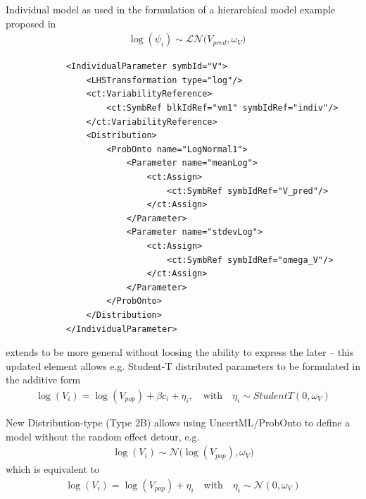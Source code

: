 \begin{example}
Individual model as used in the formulation of a hierarchical model example
proposed in \cite{LavielleFourModels:2014}
\begin{align*}
		&\log(\psi_i) \sim \mathcal {LN}\big(V_{pred}, \omega_V\big) 
\end{align*}

\lstset{language=XML}
\begin{lstlisting}
            <IndividualParameter symbId="V">
                <LHSTransformation type="log"/>
                <ct:VariabilityReference>
                    <ct:SymbRef blkIdRef="vm1" symbIdRef="indiv"/>
                </ct:VariabilityReference>
                <Distribution>
                    <ProbOnto name="LogNormal1">
                        <Parameter name="meanLog">
                            <ct:Assign>
                                <ct:SymbRef symbIdRef="V_pred"/>
                            </ct:Assign>
                        </Parameter>
                        <Parameter name="stdevLog">
                            <ct:Assign>
                                <ct:SymbRef symbIdRef="omega_V"/>
                            </ct:Assign>
                        </Parameter>
                    </ProbOnto>
                </Distribution>
            </IndividualParameter>
\end{lstlisting}
\end{example}

\begin{note}  extends  to be more general
without loosing the ability to express the later -- this updated element allows e.g. Student-T 
distributed parameters to be formulated in the additive form
\begin{align*}
                \log(V_i) = \log(V_{pop}) + \beta c_i + \eta_i, \quad \text{with} \quad \eta_i \sim StudentT(0,\omega_V)
\end{align*}
\end{note}

\begin{note}  New Distribution-type (Type 2B) allows using UncertML/ProbOnto 
to define a model without the random effect detour, e.g.
\begin{align*}
		\log(V_i) \sim \mathcal N\big(\log(V_{pop}), \omega_V\big) 		
\end{align*}
which is equivalent to 
\begin{align*}
                \log(V_i) = \log(V_{pop}) + \eta_i \quad \text{with} \quad \eta_i \sim \mathcal N(0,\omega_V)
\end{align*}
\end{note}

